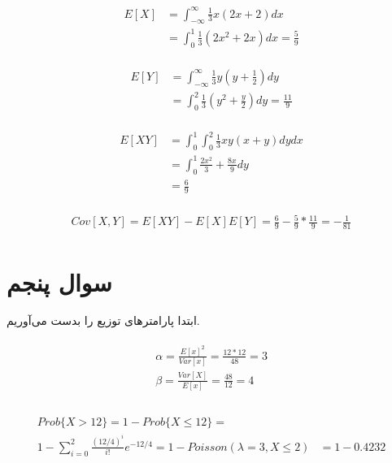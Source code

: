 \documentclass[paper=a4, fontsize=11pt]{article}
\numberwithin{equation}{section} %
\numberwithin{figure}{section} %
\numberwithin{table}{section} %
\begin{document}
\begin{align}
\begin{split}
    E[X] &= \int_{-\infty}^{\infty} \frac{1}{3}x(2x + 2)dx \\
    &= \int_{0}^{1} \frac{1}{3}(2x^2 + 2x)dx = \frac{5}{9}
\end{split}
\end{align}

\begin{align}
\begin{split}
    E[Y] &= \int_{-\infty}^{\infty} \frac{1}{3}y(y + \frac{1}{2})dy \\
    &= \int_{0}^{2} \frac{1}{3}(y^2 + \frac{y}{2})dy = \frac{11}{9}
\end{split}
\end{align}

\begin{align}
\begin{split}
    E[XY] &= \int_{0}^{1}\int_{0}^{2} \frac{1}{3}xy(x + y)dydx\\
    &= \int_{0}^{1} \frac{2x^2}{3} + \frac{8x}{9} dy\\
    &= \frac{6}{9}
\end{split}
\end{align}

\begin{align}
\begin{split}
    Cov[X,Y] = E[XY] - E[X]E[Y] = \frac{6}{9} - \frac{5}{9} * \frac{11}{9} = -\frac{1}{81}
\end{split}
\end{align}

\section{سوال پنجم}
ابتدا پارامتر‌های توزیع را بدست می‌آوریم.

\begin{align}
\begin{split}
    \alpha = \frac{E[x]^2}{Var[x]} = \frac{12 * 12}{48} = 3\\
    \beta = \frac{Var[X]}{E[x]} = \frac{48}{12} = 4\\
\end{split}
\end{align}

\begin{align}
\begin{split}
    Prob\{X > 12\} = 1 - Prob\{X \le 12\} =&\\
    1 - \sum_{i=0}^{2} \frac{(12/4)^i}{i!} e^{-12/4} = 1 - Poisson(\lambda = 3, X \le 2)
    &= 1 - 0.4232
\end{split}
\end{align}
\end{document}
